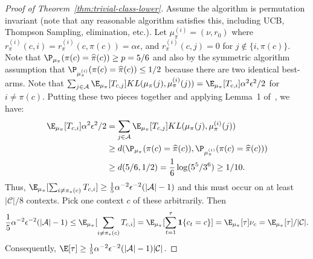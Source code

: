 \documentclass{article}
\newcommand{\mc}[1]{\mathcal{#1}}
\newcommand{\1}{\mathbf{1}}
\begin{document}
\begin{proof}[Proof of Theorem~\ref{thm:trivial-class-lower}]
Assume the algorithm is permutation invariant (note that any reasonable algorithm satisfies this, including UCB, Thompson Sampling, elimination, etc.).
Let $\mu_\pi^{(i)} = (\nu,r_0)$ where $r_\pi^{(i)}(c,i) = r_\pi^{(i)}(c,\pi(c)) = \alpha \epsilon$, and $r_\pi^{(i)}(c,j) = 0$ for $j \not\in \{i,\pi(c)\}$.
Note that $\P_{\mu_\pi}( \pi(c) = \widehat{\pi}(c) ) \geq p = 5/6$ and also by the symmetric algorithm assumption that $\P_{\mu_\pi^{(i)}}( \pi(c) = \widehat{\pi}(c) ) \leq 1/2$ because there are two identical best-arms. 
Note that $\sum_{j \in \mc{A}} \E_{\mu_\pi}[T_{c,j}] KL(\mu_\pi(j),\mu^{(i)}_\pi(j) ) = \E_{\mu_\pi}[T_{c,i}] \alpha^2 \epsilon^2 /2$ for $i \neq \pi(c)$.
Putting these two pieces together and applying Lemma~1 of~\cite{kaufmann2016complexity}, we have:
\begin{align*}
    \E_{\mu_\pi}[T_{c,i}] \alpha^2 \epsilon^2 /2 &= \sum_{j \in \mc{A}} \E_{\mu_\pi}[T_{c,j}] KL(\mu_\pi(j),\mu^{(i)}_\pi(j) ) \\
    &\geq d( \P_{\mu_\pi}( \pi(c) = \widehat{\pi}(c)) , \P_{\mu_\pi^{(i)}}( \pi(c) = \widehat{\pi}(c) ) )\\
    &\geq d(5/6,1/2) = \frac{1}{6}\log(5^5/3^6) \geq 1/10.
\end{align*}
Thus, $ \E_{\mu_\pi}[\sum_{i \neq \pi_*(c)} T_{c,i}] \geq \frac{1}{5}\alpha^{-2} \epsilon^{-2} (|\mc{A}|-1)$ and this must occur on at least $|\mc{C}| /8$ contexts. 
Pick one context $c$ of these arbitrarily. 
Then
\begin{align*}
    \frac{1}{5}\alpha^{-2} \epsilon^{-2} (|\mc{A}|-1) \leq \E_{\mu_\pi}[\sum_{i \neq \pi_*(c)} T_{c,i}] = \E_{\mu_\pi}[\sum_{t =1}^\tau \1\{ c_t = c\} ] = \E_{\mu_\pi}[ \tau ] \nu_c = \E_{\mu_\pi}[ \tau ] /|\mc{C}|.  
\end{align*}
Consequently, $\E[\tau] \geq  \frac{1}{5}\alpha^{-2} \epsilon^{-2} (|\mc{A}|-1) |\mc{C}|$.

\end{proof}
\end{document}
